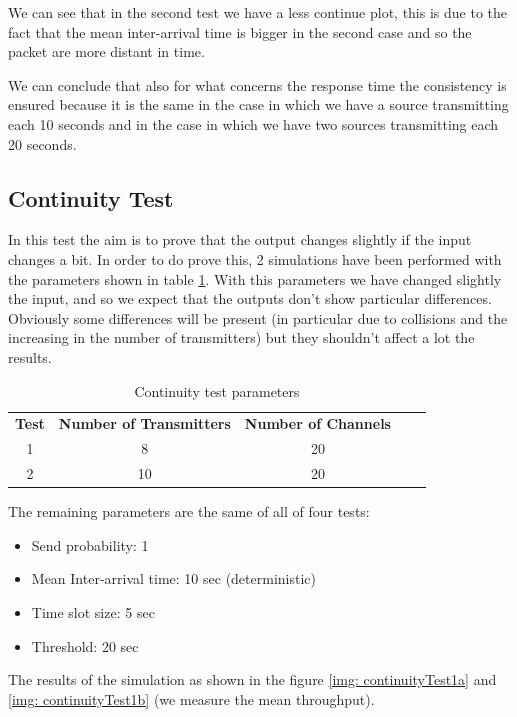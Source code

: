 \noindent We can see that in the second test we have a less continue plot, this is due to the fact that the mean inter-arrival time is bigger in the second case and so the packet are more distant in time.

\noindent We can conclude that also for what concerns the response time the consistency is ensured because it is the same in the case in which we have a source transmitting each 10 seconds and in the case in which we have two sources transmitting each 20 seconds. 

\subsection{Continuity Test}
In this test the aim is to prove that the output changes slightly if the input changes a bit. In order to do prove this, 2 simulations have been performed with the parameters shown in table \ref{tab: continuity test}. With this parameters we have changed slightly the input, and so we expect that the outputs don't show particular differences. Obviously some differences will be present (in particular due to collisions and the increasing in the number of transmitters) but they shouldn't affect a lot the results.

\begin{table}[htpb]
	\centering
		\begin{tabular}{|c|c|c|ll}
			\cline{1-3}
			{\textbf{Test}} & { \textbf{Number of Transmitters}} & { \textbf{Number of Channels}} &  &  \\ \cline{1-3}
			1 & 8  & 20 &  &  \\ \cline{1-3}
			2 & 10 & 20 &  &  \\ \cline{1-3}
		\end{tabular}
	\caption{Continuity test parameters}
	\label{tab: continuity test}
\end{table}

\noindent The remaining parameters are the same of all of four tests:
\begin{itemize}
	\item Send probability: 1
	\item Mean Inter-arrival time: 10 sec (deterministic)
	\item Time slot size: 5 sec
	\item Threshold: 20 sec
\end{itemize}

\noindent The results of the simulation as shown in the figure \ref{img: continuityTest1a} and \ref{img: continuityTest1b} (we measure the mean throughput).

